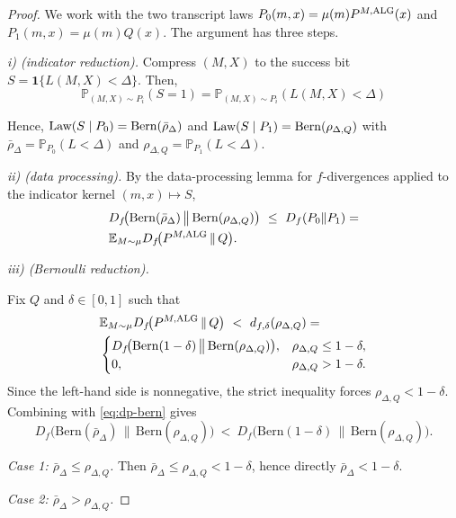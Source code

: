 \documentclass[conference]{IEEEtran}
\begin{document}
\begin{proof}[Proof]
We work with the two transcript laws
$P_0(m,x)=\mu(m)P^{M,\textup{ALG}}(x)$ and $P_1(m,x)=\mu(m)Q(x)$.
The argument has three steps.

\emph{i) (indicator reduction).}
Compress $(M,X)$ to the success bit
$S=\mathbf 1\{L(M,X)<\Delta\}$. Then, 
\[
\mathbb P_{(M,X) \sim P_i}(S=1)=\mathbb P_{(M,X) \sim P_i}(L(M,X)< \Delta)
\]

Hence,
$\textup{Law}(S\mid P_0)=\mathrm{Bern}(\bar\rho_\Delta)$ and
$\textup{Law}(S\mid P_1)=\mathrm{Bern}(\rho_{\Delta,Q})$ with
$\bar\rho_\Delta=\mathbb P_{P_0}(L<\Delta)$ and
$\rho_{\Delta,Q}=\mathbb P_{P_1}(L<\Delta)$.

\emph{ii) (data processing).}
By the data-processing lemma for $f$-divergences applied to the indicator
kernel $(m,x)\mapsto S$,
\begin{equation}
\label{eq:dp-bern}
\begin{aligned}
    &D_f\!\big(\mathrm{Bern}(\bar\rho_\Delta)\,\big\|\,\mathrm{Bern}(\rho_{\Delta,Q})\big)
    \ \le\
    D_f(P_0\|P_1)
    =
    \\
    &\mathbb{E}_{M\sim\mu} D_f\!\big(P^{M,\textup{ALG}}\,\|\,Q\big).
\end{aligned}
\end{equation}


\emph{iii) (Bernoulli reduction).}

Fix $Q$ and $\delta\in[0,1]$ such that
\[
\begin{aligned}
&\mathbb{E}_{M\sim\mu} D_f\!\big(P^{M,\textup{ALG}}\,\|\,Q\big)\ <\ d_{f,\delta}(\rho_{\Delta,Q}) =
\\
&\begin{cases}
D_f\!\big(\mathrm{Bern}(1-\delta)\,\big\|\,\mathrm{Bern}(\rho_{\Delta,Q})\big), & \rho_{\Delta,Q}\le 1-\delta,\\
0, & \rho_{\Delta,Q}>1-\delta.
\end{cases}
\end{aligned}
\]
Since the left-hand side is nonnegative, the strict inequality forces $\rho_{\Delta,Q}<1-\delta$.
Combining with \eqref{eq:dp-bern} gives
\[
D_f\!\big(\mathrm{Bern}(\bar\rho_\Delta)\,\big\|\,\mathrm{Bern}(\rho_{\Delta,Q})\big)
\ <\
D_f\!\big(\mathrm{Bern}(1-\delta)\,\big\|\,\mathrm{Bern}(\rho_{\Delta,Q})\big).
\]

\emph{Case 1: $\bar\rho_\Delta \le \rho_{\Delta,Q}$.}
Then $\bar\rho_\Delta \le \rho_{\Delta,Q} < 1-\delta$, hence directly $\bar\rho_\Delta<1-\delta$.

\emph{Case 2: $\bar\rho_\Delta > \rho_{\Delta,Q}$.}



\end{proof}
\end{document}
